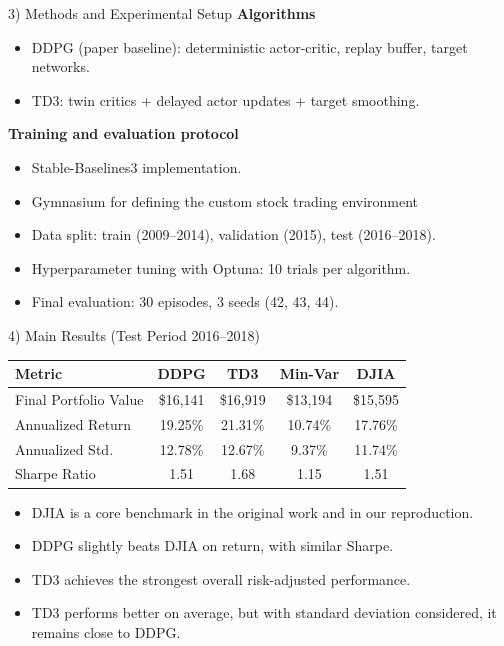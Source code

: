 \documentclass[aspectratio=169]{beamer}
\begin{document}
\begin{frame}{3) Methods and Experimental Setup}
  \textbf{Algorithms}
  \begin{itemize}
    \item DDPG (paper baseline): deterministic actor-critic, replay buffer, target networks.
    \item TD3: twin critics + delayed actor updates + target smoothing.
  \end{itemize}

  \vspace{0.5em}
  \textbf{Training and evaluation protocol}
  \begin{itemize}
    \item Stable-Baselines3 implementation.
    \item Gymnasium for defining the custom stock trading environment
    \item Data split: train (2009--2014), validation (2015), test (2016--2018).
    \item Hyperparameter tuning with Optuna: 10 trials per algorithm.
    \item Final evaluation: 30 episodes, 3 seeds (42, 43, 44).
  \end{itemize}

  \vspace{0.5em}
\end{frame}

\begin{frame}{4) Main Results (Test Period 2016--2018)}
  \small
  \begin{tabular}{lcccc}
    \toprule
    Metric & DDPG & TD3 & Min-Var & DJIA \\
    \midrule
    Final Portfolio Value & \$16,141 & \$16,919 & \$13,194 & \$15,595 \\
    Annualized Return & 19.25\% & 21.31\% & 10.74\% & 17.76\% \\
    Annualized Std. & 12.78\% & 12.67\% & 9.37\% & 11.74\% \\
    Sharpe Ratio & 1.51 & 1.68 & 1.15 & 1.51 \\
    \bottomrule
  \end{tabular}

  \vspace{0.75em}
  \begin{itemize}
    \item DJIA is a core benchmark in the original work and in our reproduction.
    \item DDPG slightly beats DJIA on return, with similar Sharpe.
    \item TD3 achieves the strongest overall risk-adjusted performance.
    \item TD3 performs better on average, but with standard deviation considered, it remains close to DDPG.
  \end{itemize}

\end{frame}
\end{document}
